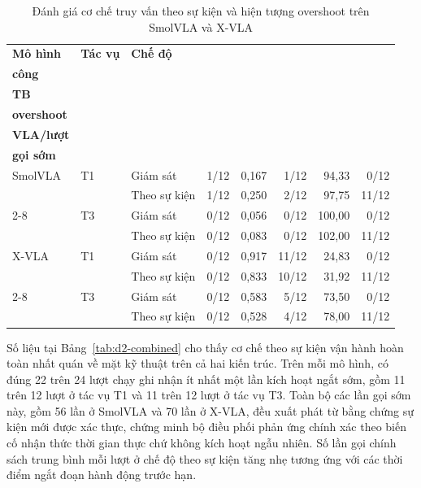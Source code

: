 \begin{table}[htbp]
\centering\footnotesize
\caption{Đánh giá cơ chế truy vấn theo sự kiện và hiện tượng overshoot trên SmolVLA và X-VLA}
\label{tab:d2-combined}
\label{tab:d2-decision-results}
\label{tab:d2-calibration-results}
\setlength{\tabcolsep}{3.5pt}
\begin{tabular}{l|l|l|r|r|r|r|r}
\toprule
\textbf{Mô hình} & \textbf{Tác vụ} & \textbf{Chế độ} & \shortstack{\textbf{Thành}\\\textbf{công}} & \shortstack{\textbf{SCR}\\\textbf{TB}} & \shortstack{\textbf{Vi phạm}\\\textbf{overshoot}} & \shortstack{\textbf{Lần gọi}\\\textbf{VLA/lượt}} & \shortstack{\textbf{Lượt có}\\\textbf{gọi sớm}} \\
\midrule
SmolVLA & T1 & Giám sát & 1/12 & 0,167 & 1/12 & 94,33 & 0/12 \\
        &    & Theo sự kiện & 1/12 & 0,250 & 2/12 & 97,75 & 11/12 \\
        \cmidrule{2-8}
        & T3 & Giám sát & 0/12 & 0,056 & 0/12 & 100,00 & 0/12 \\
        &    & Theo sự kiện & 0/12 & 0,083 & 0/12 & 102,00 & 11/12 \\
\midrule
X-VLA   & T1 & Giám sát & 0/12 & 0,917 & 11/12 & 24,83 & 0/12 \\
        &    & Theo sự kiện & 0/12 & 0,833 & 10/12 & 31,92 & 11/12 \\
        \cmidrule{2-8}
        & T3 & Giám sát & 0/12 & 0,583 & 5/12 & 73,50 & 0/12 \\
        &    & Theo sự kiện & 0/12 & 0,528 & 4/12 & 78,00 & 11/12 \\
\bottomrule
\end{tabular}
\end{table}

Số liệu tại Bảng~\ref{tab:d2-combined} cho thấy cơ chế theo sự kiện vận hành hoàn toàn nhất quán về mặt kỹ thuật trên cả hai kiến trúc. Trên mỗi mô hình, có đúng 22 trên 24 lượt chạy ghi nhận ít nhất một lần kích hoạt ngắt sớm, gồm 11 trên 12 lượt ở tác vụ T1 và 11 trên 12 lượt ở tác vụ T3. Toàn bộ các lần gọi sớm này, gồm 56 lần ở SmolVLA và 70 lần ở X-VLA, đều xuất phát từ bằng chứng sự kiện mới được xác thực, chứng minh bộ điều phối phản ứng chính xác theo biến cố nhận thức thời gian thực chứ không kích hoạt ngẫu nhiên. Số lần gọi chính sách trung bình mỗi lượt ở chế độ theo sự kiện tăng nhẹ tương ứng với các thời điểm ngắt đoạn hành động trước hạn.

